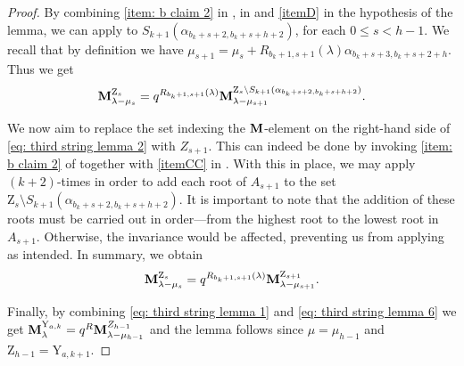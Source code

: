 \begin{proof}
By combining  \cref{item: b claim 2} in ,    in   and \cref{itemD} in the hypothesis of the lemma, we can apply  to $S_{k+1}(\alpha_{b_k+s+2,b_k+s+h+2 })$,  for each $0\leq s<h-1$. 
We recall that by definition we have
$\mu_{s+1}= \mu_s +R_{b_k+1,s+1}(\lambda) \alpha_{b_k+s+3,b_k+s+2+h}$.
Thus we get
\begin{equation}\label{eq: third string lemma 2}
    \mathbf{M}_{\lambda -\mu_{s}}^{\mathrm{Z}_{s}} = q^{R_{b_{k}+1,s+1}(\lambda)}\mathbf{M}_{\lambda -\mu_{s+1}}^{\mathrm{Z}_{s}\setminus S_{k+1}(\alpha_{b_k+s+2,b_k+s+h+2 })}.
\end{equation} 

We now aim to replace the set indexing the $\mathbf{M}$-element on the right-hand side of \eqref{eq: third string lemma 2} with $Z_{s+1}$. This can indeed be done by invoking   \cref{item: b claim 2} of  together with \cref{itemCC} in .
With this in place, we may apply  $(k+2)$-times in order to add each root of $A_{s+1}$ to the set $\mathrm{Z}_{s}\setminus S_{k+1}(\alpha_{b_k+s+2,b_k+s+h+2 })$.
It is important to note that the addition of these roots must be carried out in order—from the highest root to the lowest root in $A_{s+1}$. Otherwise, the invariance would be affected, preventing us from applying  as intended. 
In summary, we obtain
\begin{equation}\label{eq: third string lemma 6}
\mathbf{M}_{\lambda-\mu_{s}}^{\mathrm{Z}_{s}} = q^{R_{b_{k}+1,s+1}(\lambda)}\mathbf{M}_{\lambda-\mu_{s+1}}^{\mathrm{Z}_{s+1}}.
\end{equation}

 Finally,  by combining \eqref{eq: third string lemma 1} and \eqref{eq: third string lemma 6} we get $\mathbf{M}_{\lambda}^{\mathrm{Y}_{a,k}} =q^R \mathbf{M}_{\lambda - \mu_{h-1}}^{Z_{h-1}}$ and the lemma follows since $\mu =\mu_{h-1}$ and $\mathrm{Z}_{h-1} = \mathrm{Y}_{a,k+1}$.
\end{proof}


